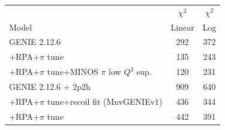 \documentclass[aps,preprint,showpacs,superscriptaddress,groupedaddress,linenumbers]{revtex4-2}  %
\begin{document}
\begin{table}
\renewcommand*{\arraystretch}{1.2}
\begin{ruledtabular}
\begin{tabular}{lcc}

    &  $\chi^2$ &   $\chi^2$ \\ 
Model & Linear & Log \\
\hline
GENIE 2.12.6 &	        292 &	        372 \\
\qquad+RPA+$\pi$ tune &	        135 &	        243 \\
\qquad+RPA+$\pi$ tune+MINOS $\pi$ low $Q^2$ sup. &	        120 &	        231 \\
\hline%
GENIE 2.12.6 + 2p2h &	        909 &	        640 \\
\qquad+RPA+$\pi$ tune+recoil fit (MnvGENIEv1) &	        436 &	        344 \\
\qquad+RPA+$\pi$ tune &	        442 &	        391 \\

\end{tabular}
\end{ruledtabular}
\end{table}
\end{document}
